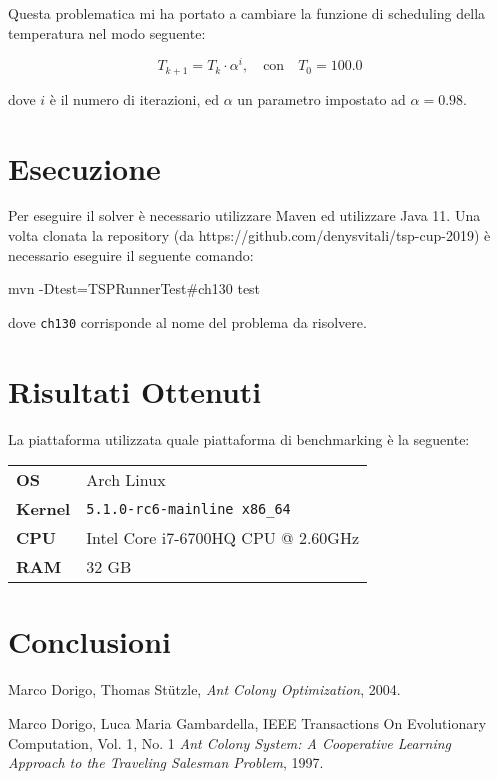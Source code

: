 \documentclass{article}
\begin{document}
Questa problematica mi ha portato a cambiare la funzione di scheduling della
temperatura nel modo seguente:

\begin{equation}
    T_{k+1} = T_k \cdot \alpha^{i}, \quad \text{con} \quad T_0 = 100.0
\end{equation}

dove $i$ è il numero di iterazioni, ed $\alpha$ un parametro impostato ad $\alpha = 0.98$.
\pagebreak
\section{Esecuzione}
Per eseguire il solver è necessario utilizzare Maven ed utilizzare Java 11.
Una volta clonata la repository (da https://github.com/denysvitali/tsp-cup-2019)
è necessario eseguire il seguente comando:
\begin{code}
    mvn -Dtest=TSPRunnerTest#ch130 test
\end{code}
dove \texttt{ch130} corrisponde al nome del problema da risolvere.

\section{Risultati Ottenuti}
La piattaforma utilizzata quale piattaforma di benchmarking è la seguente:

\begin{tabular}{|l|l|}
    \hline
    \textbf{OS}     & Arch Linux                          \\
    \textbf{Kernel} & \texttt{5.1.0-rc6-mainline x86\_64} \\
    \textbf{CPU}    & Intel Core i7-6700HQ CPU @ 2.60GHz  \\
    \textbf{RAM}    & 32 GB                               \\
    \hline
\end{tabular}



\section{Conclusioni}

\pagebreak
\begin{thebibliography}{9}
    Marco Dorigo, Thomas Stützle,
    \textit{Ant Colony Optimization}, 2004.

    Marco Dorigo, Luca Maria Gambardella,
    IEEE Transactions On Evolutionary Computation, Vol. 1, No. 1
    \textit{Ant Colony System: A Cooperative Learning Approach to the Traveling Salesman Problem},
    1997.
\end{thebibliography}
\end{document}
